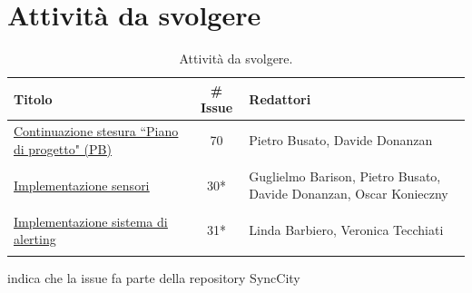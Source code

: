 \documentclass[8pt]{article}
\begin{document}
\section{Attività da svolgere}
\begin{table}[ht!]
	\centering
	\begin{tabular}{p{7cm}cp{7cm}}
		\toprule
		\textbf{Titolo} & \textbf{\# Issue} & \textbf{Redattori} \\
		\midrule
		\href{https://github.com/NaN1fy/docs/issues/70}{\underline{Continuazione stesura
      ``Piano di progetto" (PB)}} & 70 & Pietro Busato, Davide Donanzan \\\\
		\href{https://github.com/NaN1fy/SyncCity/issues/30}{\underline{Implementazione sensori}} &
      30*\tnote{*} & Guglielmo Barison, Pietro Busato, Davide Donanzan, Oscar Konieczny \\\\
		\href{https://github.com/NaN1fy/SyncCity/issues/31}{\underline{Implementazione sistema di
      alerting}} & 31*\tnote{*} & Linda Barbiero, Veronica Tecchiati\\\\
		\bottomrule
	\end{tabular}
	\begin{tablenotes}
		\vspace{1em}
		\item * indica che la issue fa parte della repository SyncCity
	\end{tablenotes}
	\caption{Attività da svolgere.}
	\label{table:Attivita da svolgere}
\end{table}
\end{document}
